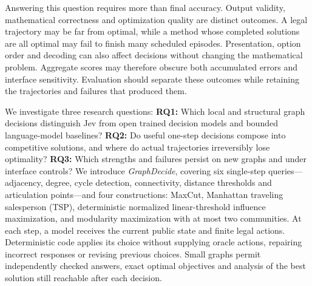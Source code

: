 Answering this question requires more than final accuracy. Output validity,
mathematical correctness and optimization quality are distinct outcomes.
A legal trajectory may be far from optimal, while a method whose completed
solutions are all optimal may fail to finish many scheduled episodes.
Presentation, option order and decoding can also affect decisions without
changing the mathematical problem. Aggregate scores may therefore obscure
both accumulated errors and interface sensitivity. Evaluation should
separate these outcomes while retaining the trajectories and failures that
produced them.

We investigate three research questions:
\textbf{RQ1:} Which local and structural graph decisions distinguish Jev
from open trained decision models and bounded language-model baselines?
\textbf{RQ2:} Do useful one-step decisions compose into competitive solutions,
and where do actual trajectories irreversibly lose optimality?
\textbf{RQ3:} Which strengths and failures persist on new graphs and under
interface controls?
We introduce \emph{GraphDecide}, covering six single-step queries---adjacency,
degree, cycle detection, connectivity, distance thresholds and articulation
points---and four constructions: MaxCut, Manhattan traveling salesperson
(TSP), deterministic normalized linear-threshold influence maximization,
and modularity maximization with at most two communities.
At each step, a model receives the current public state and finite legal
actions. Deterministic code applies its choice without supplying oracle
actions, repairing incorrect responses or revising previous choices.
Small graphs permit independently checked answers, exact optimal objectives
and analysis of the best solution still reachable after each decision.

